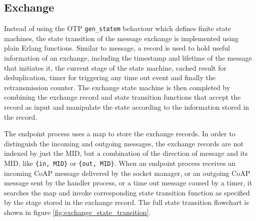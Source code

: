 \subsection{Exchange}\label{exchange_implementation}

Instead of using the OTP \verb|gen_statem| behaviour which defines finite state machines, the state transition of the message exchange is implemented using plain Erlang functions. Similar to message, a record is used to hold useful information of an exchange, including the timestamp and lifetime of the message that initiates it, the current stage of the state machine, cached result for deduplication, timer for triggering any time out event and finally the retransmission counter. The exchange state machine is then completed by combining the exchange record and state transition functions that accept the record as input and manipulate the state according to the information stored in the record.

The endpoint process uses a map to store the exchange records. In order to distinguish the incoming and outgoing messages, the exchange records are not indexed by just the MID, but a combination of the direction of message and its MID, like \verb|{in, MID}| or \verb|{out, MID}|. When an endpoint process receives an incoming CoAP message delivered by the socket manager, or an outgoing CoAP message sent by the handler process, or a time out message caused by a timer, it searches the map and invoke corresponding state transition function as specified by the stage stored in the exchange record. The full state transition flowchart is shown in figure \ref{fig:exchange_state_transition}.


